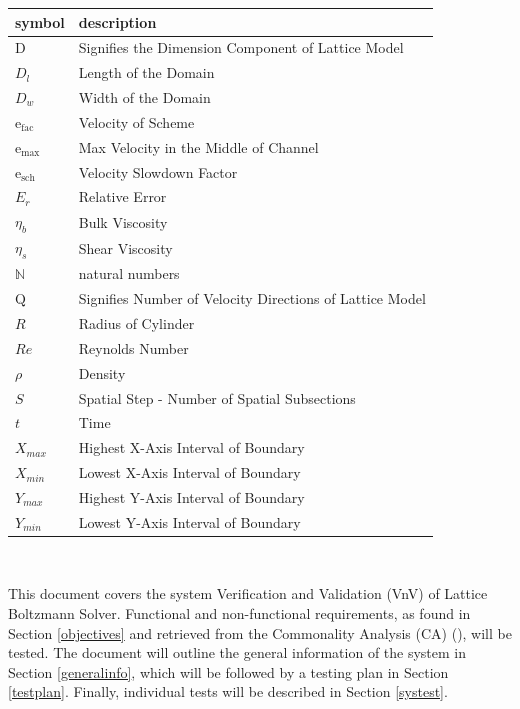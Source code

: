 \documentclass[12pt, titlepage]{article}
\newcommand{\famname}{Lattice Boltzmann Solver}
\begin{document}
\renewcommand{\arraystretch}{1.2}
\begin{tabular}{l l} 
  \toprule		
  \textbf{symbol} & \textbf{description}\\
  \midrule 
  $\mathrm{D}$ & Signifies the Dimension Component of Lattice Model\\
  $D_{l}$ & Length of the Domain\\
  $D_{w}$ & Width of the Domain\\
  $\mathrm{e_{fac}}$ & Velocity of Scheme\\
  $\mathrm{e_{max}}$ & Max Velocity in the Middle of Channel\\
  $\mathrm{e_{sch}}$ & Velocity Slowdown Factor\\
  $E_r$ & Relative Error\\
  $\eta_b$ & Bulk Viscosity \\
  $\eta_s$ & Shear Viscosity \\
  $\mathbb{N}$ & natural numbers\\
  $\mathrm{Q}$ & Signifies Number of Velocity Directions of Lattice Model\\
  $R$ & Radius of Cylinder\\
  $Re$ & Reynolds Number\\
  $\rho$ & Density \\
  $S$ & Spatial Step - Number of Spatial Subsections\\
  $t$ & Time \\
  $X_{max}$ & Highest X-Axis Interval of Boundary\\
  $X_{min}$ & Lowest X-Axis Interval of Boundary\\
  $Y_{max}$ & Highest Y-Axis Interval of Boundary\\
  $Y_{min}$ & Lowest Y-Axis Interval of Boundary\\
  \bottomrule
\end{tabular}\\

\newpage


\noindent This document covers the system Verification and Validation (VnV) of \famname . Functional and non-functional requirements, as found in Section \ref{objectives} and retrieved from the Commonality Analysis (CA) (\citet{LBM_CA_PM}), will be tested. The document will outline the general information of the system in Section \ref{generalinfo}, which will be followed by a testing plan in Section \ref{testplan}. Finally, individual tests will be described in Section \ref{systest}. 
\end{document}
